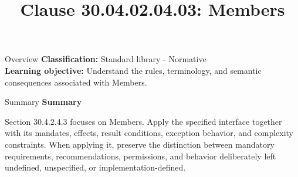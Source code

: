 \documentclass[10pt,letterpaper]{article}
\title{Clause 30.04.02.04.03: Members}
\author{}
\date{}
\begin{document}
\maketitle
\begin{CornellOverviewBox}{Overview}
\textbf{Classification:} Standard library - Normative\\[2pt]
\textbf{Learning objective:} Understand the rules, terminology, and semantic consequences associated with Members.
\end{CornellOverviewBox}\begin{CornellSummaryBox}{Summary}
{\sffamily\bfseries\color{Accent} Summary}\par\vspace{3pt}Section 30.4.2.4.3 focuses on Members. Apply the specified interface together with its mandates, effects, result conditions, exception behavior, and complexity constraints. When applying it, preserve the distinction between mandatory requirements, recommendations, permissions, and behavior deliberately left undefined, unspecified, or implementation-defined.
\end{CornellSummaryBox}
\end{document}
